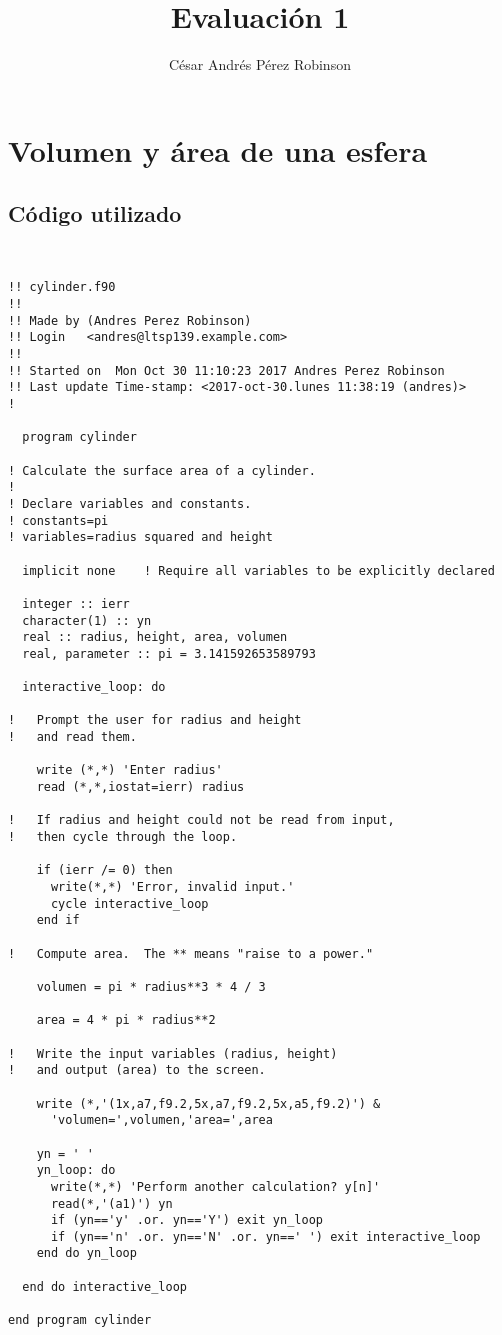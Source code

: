 \documentclass{article}
\title{Evaluación 1}
\author{César Andrés Pérez Robinson}
\begin{document}
\maketitle
\section{Volumen y área de una esfera}

\subsection{Código utilizado}
\begin{verbatim}


!! cylinder.f90
!! 
!! Made by (Andres Perez Robinson)
!! Login   <andres@ltsp139.example.com>
!! 
!! Started on  Mon Oct 30 11:10:23 2017 Andres Perez Robinson
!! Last update Time-stamp: <2017-oct-30.lunes 11:38:19 (andres)>
!

  program cylinder

! Calculate the surface area of a cylinder.
!
! Declare variables and constants.
! constants=pi
! variables=radius squared and height

  implicit none    ! Require all variables to be explicitly declared

  integer :: ierr
  character(1) :: yn
  real :: radius, height, area, volumen
  real, parameter :: pi = 3.141592653589793

  interactive_loop: do

!   Prompt the user for radius and height
!   and read them.

    write (*,*) 'Enter radius'
    read (*,*,iostat=ierr) radius

!   If radius and height could not be read from input,
!   then cycle through the loop.

    if (ierr /= 0) then
      write(*,*) 'Error, invalid input.'
      cycle interactive_loop
    end if

!   Compute area.  The ** means "raise to a power."

    volumen = pi * radius**3 * 4 / 3

    area = 4 * pi * radius**2

!   Write the input variables (radius, height)
!   and output (area) to the screen.

    write (*,'(1x,a7,f9.2,5x,a7,f9.2,5x,a5,f9.2)') &
      'volumen=',volumen,'area=',area

    yn = ' '
    yn_loop: do
      write(*,*) 'Perform another calculation? y[n]'
      read(*,'(a1)') yn
      if (yn=='y' .or. yn=='Y') exit yn_loop
      if (yn=='n' .or. yn=='N' .or. yn==' ') exit interactive_loop
    end do yn_loop

  end do interactive_loop

end program cylinder

\end{verbatim}
\end{document}
